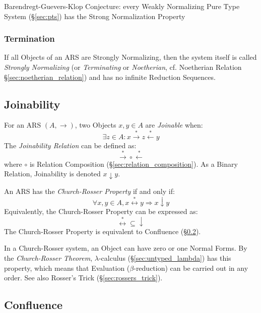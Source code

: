 Barendregt-Guevers-Klop Conjecture: every Weakly Normalizing Pure Type
System (\S\ref{sec:pts}) has the Strong Normalization Property



\subsubsection{Termination}\label{sec:rewrite_termination}

If all Objects of an ARS are Strongly Normalizing, then the system
itself is called \emph{Strongly Normalizing} (or \emph{Terminating} or
\emph{Noetherian}, cf. Noetherian Relation
\S\ref{sec:noetherian_relation}) and has no infinite Reduction
Sequences.



\subsection{Joinability}\label{sec:rewrite_join}

For an ARS $(A, \rightarrow)$, two Objects $x,y\in A$ are
\emph{Joinable} when:
\[
  \exists z \in A :
  x \stackrel{*}\rightarrow z \stackrel{*}\leftarrow y
\]
The \emph{Joinability Relation} can be defined as:
\[
  \stackrel{*}\rightarrow \circ \stackrel{*}\leftarrow
\]
where $\circ$ is Relation Composition
(\S\ref{sec:relation_composition}). As a Binary Relation, Joinability
is denoted $x \downarrow y$.

An ARS has the \emph{Church-Rosser Property} if and only if:
\[
  \forall x,y \in A, x \stackrel{*}\leftrightarrow y
  \Rightarrow x \downarrow y
\]
Equivalently, the Church-Rosser Property can be expressed as:
\[
  \stackrel{*}\leftrightarrow \subseteq \downarrow
\]
The Church-Rosser Property is equivalent to Confluence
(\S\ref{sec:rewrite_confluence}).

In a Church-Rosser system, an Object can have zero or one Normal
Forms. By the \emph{Church-Rosser Theorem}, $\lambda$-calculus
(\S\ref{sec:untyped_lambda}) has this property, which means that
Evaluation ($\beta$-reduction) can be carried out in any order. See
also Rosser's Trick (\S\ref{sec:rossers_trick}).



\subsection{Confluence}\label{sec:rewrite_confluence}

